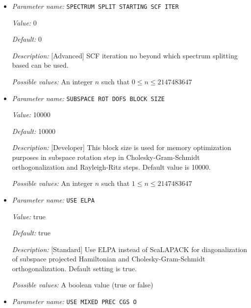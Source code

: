 \begin{itemize}
{\it Possible values:} An integer $n$ such that $0\leq n \leq 2147483647$
\item {\it Parameter name:} {\tt SPECTRUM SPLIT STARTING SCF ITER}
\label{parameters:SCF parameters/Eigen_2dsolver parameters/SPECTRUM SPLIT STARTING SCF ITER}
\label{parameters:SCF_20parameters/Eigen_2dsolver_20parameters/SPECTRUM_20SPLIT_20STARTING_20SCF_20ITER}


{\it Value:} 0


{\it Default:} 0


{\it Description:} [Advanced] SCF iteration no beyond which spectrum splitting based can be used.


{\it Possible values:} An integer $n$ such that $0\leq n \leq 2147483647$
\item {\it Parameter name:} {\tt SUBSPACE ROT DOFS BLOCK SIZE}
\label{parameters:SCF parameters/Eigen_2dsolver parameters/SUBSPACE ROT DOFS BLOCK SIZE}
\label{parameters:SCF_20parameters/Eigen_2dsolver_20parameters/SUBSPACE_20ROT_20DOFS_20BLOCK_20SIZE}


{\it Value:} 10000


{\it Default:} 10000


{\it Description:} [Developer] This block size is used for memory optimization purposes in subspace rotation step in Cholesky-Gram-Schmidt orthogonalization and Rayleigh-Ritz steps. Default value is 10000.


{\it Possible values:} An integer $n$ such that $1\leq n \leq 2147483647$
\item {\it Parameter name:} {\tt USE ELPA}
\label{parameters:SCF parameters/Eigen_2dsolver parameters/USE ELPA}
\label{parameters:SCF_20parameters/Eigen_2dsolver_20parameters/USE_20ELPA}


{\it Value:} true


{\it Default:} true


{\it Description:} [Standard] Use ELPA instead of ScaLAPACK for diagonalization of subspace projected Hamiltonian and Cholesky-Gram-Schmidt orthogonalization.  Default setting is true.


{\it Possible values:} A boolean value (true or false)
\item {\it Parameter name:} {\tt USE MIXED PREC CGS O}
\label{parameters:SCF parameters/Eigen_2dsolver parameters/USE MIXED PREC CGS O}
\label{parameters:SCF_20parameters/Eigen_2dsolver_20parameters/USE_20MIXED_20PREC_20CGS_20O}



\end{itemize}
